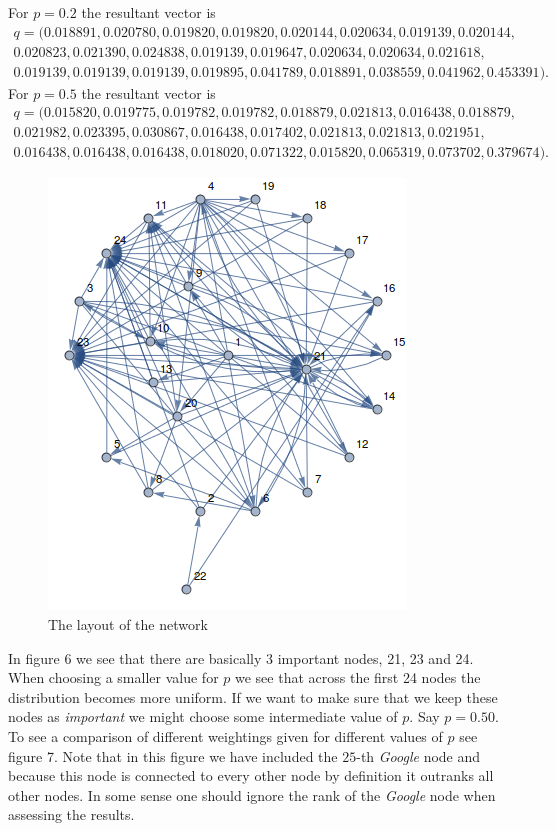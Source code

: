 \documentclass{unswmaths}
\begin{document}
For $ p = 0.2 $ the resultant vector is
\begin{align*}
    q = (
   0.018891,
   0.020780,
   0.019820,
   0.019820,
   0.020144,
   0.020634,
   0.019139,
   0.020144, \\
   0.020823,
   0.021390,
   0.024838,
   0.019139,
   0.019647,
   0.020634,
   0.020634,
   0.021618, \\
   0.019139,
   0.019139,
   0.019139,
   0.019895,
   0.041789,
   0.018891,
   0.038559,
   0.041962,
   0.453391 
).
\end{align*}
For $ p = 0.5 $ the resultant vector is
\begin{align*}
    q = (
   0.015820,
   0.019775,
   0.019782,
   0.019782,
   0.018879,
   0.021813,
   0.016438,
   0.018879, \\
   0.021982,
   0.023395,
   0.030867,
   0.016438,
   0.017402,
   0.021813,
   0.021813,
   0.021951, \\
   0.016438,
   0.016438,
   0.016438,
   0.018020,
   0.071322,
   0.015820,
   0.065319,
   0.073702,
   0.379674 
).
\end{align*}
\begin{figure}[h]
    \includegraphics[scale=0.8]{Graph}
    \caption{The layout of the network}
\end{figure}
In figure 6 we see that there are basically 3 important nodes, 21, 23 and 24. When choosing a smaller value for $ p $  we see that across the first 24 nodes the distribution becomes more uniform. If we want to make sure that we keep these nodes as \emph{important} we might choose some intermediate value of $ p $. Say $ p = 0.50 $.
To see a comparison of different weightings given for different values of $ p $ see figure 7. Note that in this figure we have included the $25$-th \emph{Google} node and because this node is connected to every other node by definition it outranks all other nodes. In some sense one should ignore the rank of the \emph{Google} node when assessing the results.
\end{document}
